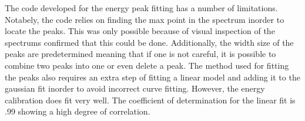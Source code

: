 	The code developed for the energy peak fitting has a number of limitations. Notabely, the code relies on finding the max point in the spectrum inorder to locate the peaks. This was only possible because of visual inspection of the spectrums confirmed that this could be done. Additionally, the width size of the peaks are predetermined meaning that if one is not careful, it is possible to combine two peaks into one or even delete a peak. The method used for fitting the peaks also requires an extra step of fitting a linear model and adding it to the gaussian fit inorder to avoid incorrect curve fitting. However, the energy calibration does fit very well. The coefficient of determination for the linear fit is .99 showing a high degree of correlation. 
